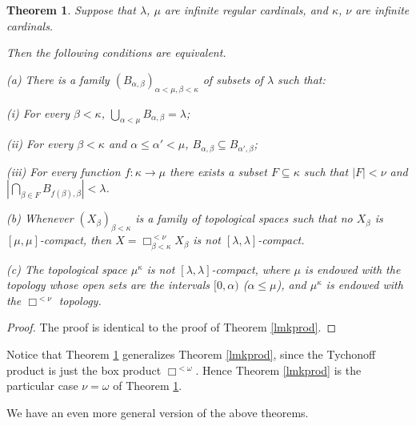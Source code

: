 \documentclass[12pt]{amsart}
\newtheorem{thm}[theorem]{Theorem}
\theoremstyle{definition}
\theoremstyle{remark}
\begin{document}
\begin{thm}\label{lmkprodbox} 
Suppose that  $ \lambda $, $\mu$  are infinite regular cardinals, 
and $\kappa $, $ \nu$  are infinite cardinals.  

Then the following conditions are equivalent.

\smallskip

(a) There is a family $ (B_{ \alpha , \beta }) _{ \alpha<\mu , \beta<\kappa}  $ 
of subsets of $ \lambda $ such that:

(i) For every $ \beta<\kappa$, $\bigcup _{ \alpha<\mu } B_{ \alpha , \beta  } = \lambda$;

(ii) For every $ \beta<\kappa$ and $ \alpha \leq \alpha ' < \mu  $, 
$ B_{ \alpha , \beta } \subseteq B_{ \alpha' , \beta }$;

(iii) For every function $f : \kappa  \to \mu $ there exists a subset
$F \subseteq \kappa  $ such that $|F|<\nu$ and 
$|\bigcap _{\beta \in F} B_{ f( \beta) , \beta }| < \lambda $.   

\smallskip

(b)
Whenever
$(X_ \beta ) _{ \beta < \kappa }$ is a family of topological spaces 
such that  no $X_ \beta $ is 
$[ \mu, \mu]$-compact,
then $X=\Box^{<\nu}_{ \beta < \kappa } X_ \beta $
 is not  $[ \lambda , \lambda ]$-compact.

\smallskip

(c) The topological space $ \mu^ \kappa $ is not
$[ \lambda , \lambda ]$-compact, where $ \mu$
is endowed with the topology whose open sets are the
intervals $ [0, \alpha) $ ($ \alpha \leq \mu$), and 
$ \mu^ \kappa $ is endowed with the 
$\Box^{<\nu}$
 topology. 
\end{thm} 

\begin{proof} 
The proof is identical to the proof of Theorem \ref{lmkprod}.
\end{proof} 

Notice that Theorem \ref{lmkprodbox} generalizes
Theorem \ref{lmkprod}, since
the Tychonoff product is just the box product
$\Box^{ <\omega } $. Hence 
Theorem \ref{lmkprod} is the particular case
$\nu=\omega$ of  Theorem \ref{lmkprodbox}.

We have an even more general version of the above theorems.
\end{document}
